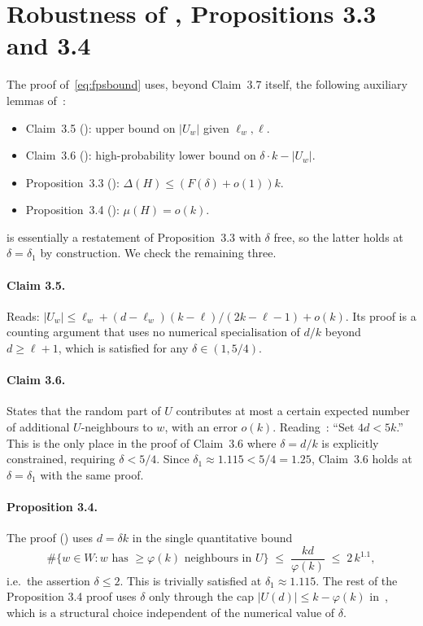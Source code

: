 \documentclass[11pt,a4paper]{article}
\theoremstyle{definition}
\begin{document}
\section{Robustness of \texorpdfstring{\cite{FPS}}{[FPS]}, Propositions 3.3 and 3.4}
\label{sec:robustness}

The proof of~\eqref{eq:fpsbound} uses, beyond Claim~3.7 itself, the
following auxiliary lemmas of~\cite{FPS}:
\begin{itemize}
\item Claim~3.5 (\cite[p.~8]{FPS}): upper bound on $|U_w|$ given
  $\ell_w,\ell$.
\item Claim~3.6 (\cite[p.~8]{FPS}): high-probability lower bound on
  $\delta\cdot k - |U_w|$.
\item Proposition~3.3 (\cite[p.~8]{FPS}): $\Delta(H)\le(F(\delta)+o(1))k$.
\item Proposition~3.4 (\cite[p.~11]{FPS}): $\mu(H)=o(k)$.
\end{itemize}

 is essentially a restatement of Proposition~3.3
with $\delta$ free, so the latter holds at $\delta=\delta_1$ by
construction. We check the remaining three.

\paragraph{Claim 3.5.}
Reads: $|U_w|\le \ell_w+(d-\ell_w)(k-\ell)/(2k-\ell-1)+o(k)$. Its
proof is a counting argument that uses no numerical specialisation of
$d/k$ beyond $d\ge\ell+1$, which is satisfied for any $\delta\in(1,5/4)$.

\paragraph{Claim 3.6.}
States that the random part of $U$ contributes at most a certain
expected number of additional $U$-neighbours to $w$, with an error
$o(k)$. Reading~\cite[p.~9]{FPS}: ``Set $4d<5k$.'' This is the only
place in the proof of Claim~3.6 where $\delta=d/k$ is explicitly
constrained, requiring $\delta<5/4$. Since
$\delta_1\approx 1.115<5/4=1.25$, Claim~3.6 holds at $\delta=\delta_1$
with the same proof.

\paragraph{Proposition 3.4.}
The proof (\cite[p.~11]{FPS}) uses $d=\delta k$ in the single
quantitative bound
\[
   \#\bigl\{w\in W: w \text{ has }\ge\varphi(k)\text{ neighbours in }U\bigr\}
   \;\le\; \frac{kd}{\varphi(k)}
   \;\le\; 2\,k^{1.1},
\]
i.e.\ the assertion $\delta\le 2$. This is trivially satisfied at
$\delta_1\approx1.115$. The rest of the Proposition 3.4 proof uses
$\delta$ only through the cap $|U(d)|\le k-\varphi(k)$ in~\cite[Footnote
1, p.~6]{FPS}, which is a structural choice independent of the
numerical value of $\delta$.
\end{document}
